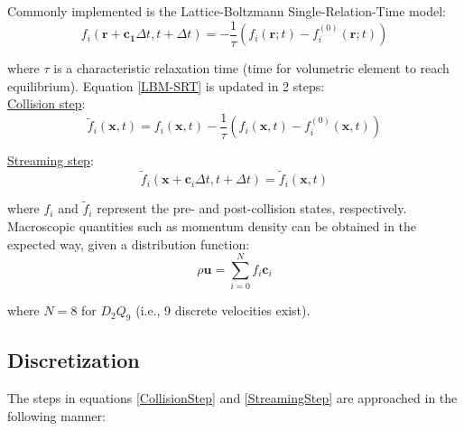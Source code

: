 \documentclass[twoside]{article}
\begin{document}
\noindent Commonly implemented is the Lattice-Boltzmann Single-Relation-Time model\cite{PerumalDass:2008Simulation}:
%
\begin{equation}
\label{LBM-SRT}
f_i(\mathbf{r} + \mathbf{c_1}\Delta t, t + \Delta t) = -\frac{1}{\tau}\left(f_i(\mathbf{r};t) - f_i^{(0)}(\mathbf{r};t)\right)
\end{equation}

\noindent where $\tau$ is a characteristic relaxation time (time for volumetric element to reach equilibrium). Equation \ref{LBM-SRT} is updated in 2 steps:\\

\noindent \underline{Collision step}:
\begin{equation}
\label{CollisionStep}
\tilde{f}_i(\mathbf{x}, t) = f_i(\mathbf{x}, t) - \frac{1}{\tau}\left(f_i(\mathbf{x}, t) - f_i^{(0)}(\mathbf{x}, t)\right)
\end{equation}

\noindent \underline{Streaming step}:
\begin{equation}
\label{StreamingStep}
\tilde{f}_i(\mathbf{x} + \mathbf{c}_i \Delta t, t + \Delta t) = \tilde{f}_i(\mathbf{x}, t)
\end{equation}

\noindent where $f_i$ and $\tilde{f}_i$ represent the pre- and post-collision states, respectively.\\

\noindent Macroscopic quantities such as momentum density can be obtained in the expected way, given a distribution function:
%
\begin{equation*}
\rho\mathbf{u} = \sum\limits_{i=0}^{N} f_i\mathbf{c}_i
\end{equation*}

\noindent where $N = 8$ for $D_2Q_9$ (i.e., 9 discrete velocities exist).\\



\subsection*{Discretization}

The steps in equations \ref{CollisionStep} and \ref{StreamingStep} are approached in the following manner:\\
\end{document}
